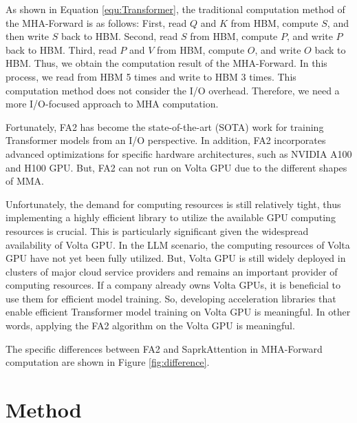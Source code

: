 \documentclass[10pt,twocolumn]{article}
\begin{document}
As shown in Equation \ref{equ:Transformer}, the traditional computation method of the MHA-Forward is as follows: First, read $Q$ and $K$ from HBM, compute $S$, and then write $S$ back to HBM. 
Second, read $S$ from HBM, compute $P$, and write $P$ back to HBM. 
Third, read $P$ and $V$ from HBM, compute $O$, and write $O$ back to HBM. 
Thus, we obtain the computation result of the MHA-Forward. 
In this process, we read from HBM 5 times and write to HBM 3 times. 
This computation method does not consider the I/O overhead.
Therefore, we need a more I/O-focused approach to MHA computation.

Fortunately, FA2 has become the state-of-the-art (SOTA) work for training Transformer models from an I/O perspective.
In addition, FA2 incorporates advanced optimizations for specific hardware architectures, such as NVIDIA A100\cite{ampere} and H100\cite{hopper} GPU.
But, FA2 can not run on Volta GPU due to the different shapes of MMA.

Unfortunately, the demand for computing resources is still relatively tight, thus implementing a highly efficient library to utilize the available GPU computing resources is crucial. 
This is particularly significant given the widespread availability of Volta GPU.
In the LLM scenario, the computing resources of Volta GPU have not yet been fully utilized.
But, Volta GPU is still widely deployed in clusters of major cloud service providers and remains an important provider of computing resources.
If a company already owns Volta GPUs, it is beneficial to use them for efficient model training.
So, developing acceleration libraries that enable efficient Transformer model training on Volta GPU is meaningful.
In other words, applying the FA2 algorithm on the Volta GPU is meaningful.

The specific differences between FA2 and SaprkAttention in MHA-Forward computation are shown in Figure \ref{fig:difference}. 

\section{Method}
\end{document}
